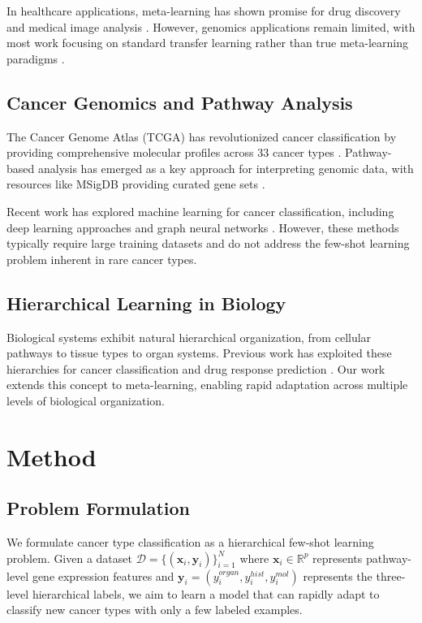 \documentclass{article}
\begin{document}
In healthcare applications, meta-learning has shown promise for drug discovery \cite{altae2017low} and medical image analysis \cite{wang2020generalizing}. However, genomics applications remain limited, with most work focusing on standard transfer learning rather than true meta-learning paradigms \cite{sharifi2019deep}.

\subsection{Cancer Genomics and Pathway Analysis}

The Cancer Genome Atlas (TCGA) has revolutionized cancer classification by providing comprehensive molecular profiles across 33 cancer types \cite{weinstein2013cancer}. Pathway-based analysis has emerged as a key approach for interpreting genomic data, with resources like MSigDB providing curated gene sets \cite{liberzon2011molecular}.

Recent work has explored machine learning for cancer classification, including deep learning approaches \cite{ching2018opportunities} and graph neural networks \cite{li2020graph}. However, these methods typically require large training datasets and do not address the few-shot learning problem inherent in rare cancer types.

\subsection{Hierarchical Learning in Biology}

Biological systems exhibit natural hierarchical organization, from cellular pathways to tissue types to organ systems. Previous work has exploited these hierarchies for cancer classification \cite{yuan2020deepgene} and drug response prediction \cite{kuenzi2020predicting}. Our work extends this concept to meta-learning, enabling rapid adaptation across multiple levels of biological organization.

\section{Method}

\subsection{Problem Formulation}

We formulate cancer type classification as a hierarchical few-shot learning problem. Given a dataset $\mathcal{D} = \{(\mathbf{x}_i, \mathbf{y}_i)\}_{i=1}^N$ where $\mathbf{x}_i \in \mathbb{R}^p$ represents pathway-level gene expression features and $\mathbf{y}_i = (y_i^{organ}, y_i^{hist}, y_i^{mol})$ represents the three-level hierarchical labels, we aim to learn a model that can rapidly adapt to classify new cancer types with only a few labeled examples.
\end{document}
